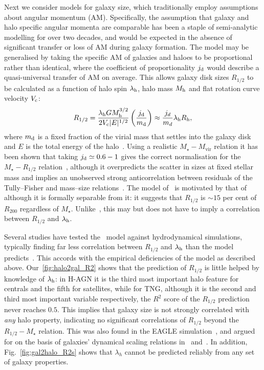 \documentclass[useAMS,usenatbib]{mnras}
\begin{document}
Next we consider models for galaxy size, which traditionally employ assumptions about angular momentum (AM). Specifically, the assumption that galaxy and halo specific angular momenta are comparable has been a staple of semi-analytic modelling for over two decades, and would be expected in the absence of significant transfer or loss of AM during galaxy formation. The model may be generalised by taking the specific AM of galaxies and haloes to be proportional rather than identical, where the coefficient of proportionality $j_{\rm d}$ would describe a quasi-universal transfer of AM on average. This allows galaxy disk sizes $R_{1/2}$ to be calculated as a function of halo spin $\lambda_{\rm h}$, halo mass $M_{\rm h}$ and flat rotation curve velocity $V_{\rm c}$:
\begin{equation}\label{eq:MMW}
    R_{1/2} = \frac{\lambda_{\rm h} G M_{\rm h}^{3/2}}{2 V_{\rm c} |E|^{1/2}}\left(\frac{j_{\rm d}}{m_{\rm d}}\right) \approx \frac{j_d}{m_d} \lambda_{\rm h} R_{\rm h},
\end{equation}
where $m_{\rm d}$ is a fixed fraction of the virial mass that settles into the galaxy disk and $E$ is the total energy of the halo~\citep{MMW_1998}. Using a realistic $M_\star-M_\text{vir}$ relation it has been shown that taking $j_{\rm d}\simeq0.6-1$ gives the correct normalisation for the $M_\star-R_{1/2}$ relation~\citep{Desmond_Wechsler_2015, Posti, Pina}, although it overpredicts the scatter in sizes at fixed stellar mass and implies an unobserved strong anticorrelation between residuals of the Tully--Fisher and mass--size relations~\citep{de_Jong_2000,Gnedin_2007,Desmond_Wechsler_2015,Desmond_2019}. The model of~\citet{Kravtsov_2013} is motivated by that of~\citeauthor{MMW_1998} although it is formally separable from it: it suggests that $R_{1/2}$ is $\sim15$ per cent of $R_\text{200}$ regardless of $M_\star$. Unlike~\citeauthor{MMW_1998}, this may but does not have to imply a correlation between $R_{1/2}$ and $\lambda_{\rm h}$.

Several studies have tested the~\citeauthor{MMW_1998} model against hydrodynamical simulations, typically finding far less correlation between $R_{1/2}$ and $\lambda_{\rm h}$ than the model predicts~\citep{Sales_2009, Sales_2012, Stevens, Desmond_2017,Jiang_2019,Yang_2021,Rohr}. This accords with the empirical deficiencies of the model as described above. Our~\cref{fig:halo2gal_R2} shows that the prediction of $R_{1/2}$ is little helped by knowledge of $\lambda_{\rm h}$: in H-AGN it is the third most important halo feature for centrals and the fifth for satellites, while for TNG, although it is the second and third most important variable respectively, the $R^2$ score of the $R_{1/2}$ prediction never reaches $0.5$. This implies that galaxy size is not strongly correlated with \emph{any} halo property, indicating no significant correlations of $R_{1/2}$ beyond the $R_{1/2}-M_\star$ relation. This was also found in the EAGLE simulation~\citep{Desmond_2017}, and argued for on the basis of galaxies' dynamical scaling relations in~\citet{Desmond_MDAR} and~\citet{Desmond_2019}. In addition, Fig.~\ref{fig:gal2halo_R2s} shows that $\lambda_h$ cannot be predicted reliably from any set of galaxy properties.
\end{document}
